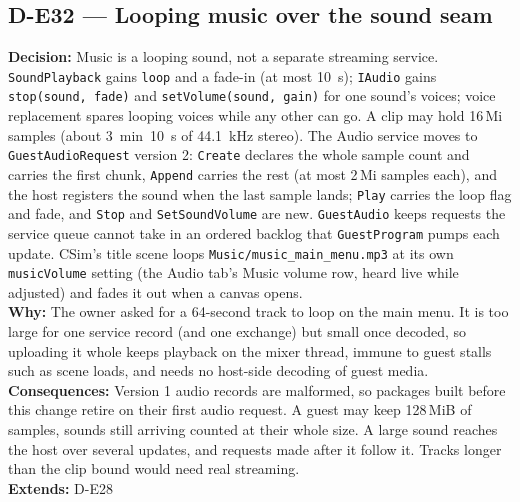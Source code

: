 \subsection*{D-E32 --- Looping music over the sound seam}
\begin{decisionbox}[title={D-E32 \quad 2026-09-27}]
\textbf{Decision:} Music is a looping sound, not a separate streaming
service. \texttt{SoundPlayback} gains \texttt{loop} and a fade-in (at most
10~s); \texttt{IAudio} gains \texttt{stop(sound, fade)} and
\texttt{setVolume(sound, gain)} for one sound's voices; voice replacement
spares looping voices while any other can go. A clip may hold 16\,Mi samples
(about 3~min~10~s of 44.1~kHz stereo). The Audio service moves to
\texttt{GuestAudioRequest} version 2: \texttt{Create} declares the whole sample
count and carries the first chunk, \texttt{Append} carries the rest (at most
2\,Mi samples each), and the host registers the sound when the last sample
lands; \texttt{Play} carries the loop flag and fade, and \texttt{Stop} and
\texttt{SetSoundVolume} are new. \texttt{GuestAudio} keeps requests the service
queue cannot take in an ordered backlog that \texttt{GuestProgram} pumps each
update. CSim's title scene loops \texttt{Music/music\_main\_menu.mp3} at its own
\texttt{musicVolume} setting (the Audio tab's Music volume row, heard live
while adjusted) and fades it out when a canvas opens.\\
\textbf{Why:} The owner asked for a 64-second track to loop on the main menu.
It is too large for one service record (and one exchange) but small once
decoded, so uploading it whole keeps playback on the mixer thread, immune to
guest stalls such as scene loads, and needs no host-side decoding of guest
media.\\
\textbf{Consequences:} Version 1 audio records are malformed, so packages
built before this change retire on their first audio request. A guest may keep
128\,MiB of samples, sounds still arriving counted at their whole size. A
large sound reaches the host over several updates, and requests made after it
follow it. Tracks longer than the clip bound would need real streaming.\\
\textbf{Extends:} D-E28
\end{decisionbox}

